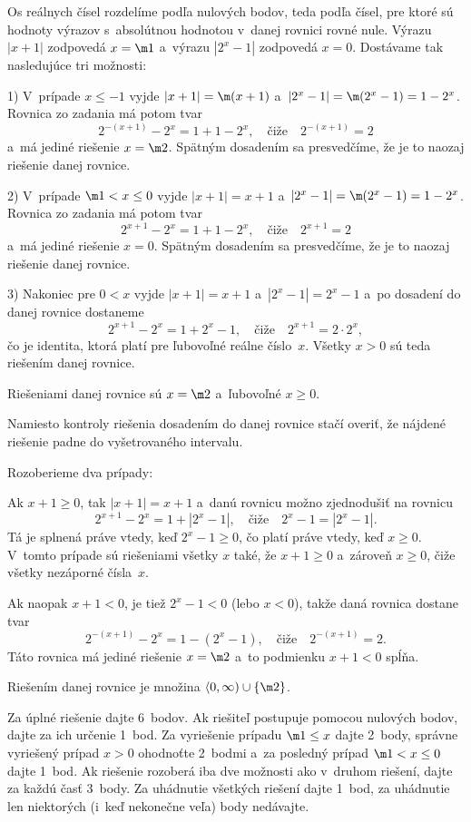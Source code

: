 {%
Os reálnych čísel rozdelíme podľa nulových bodov, teda podľa čísel,
pre ktoré sú hodnoty výrazov s~absolútnou
hodnotou v~danej rovnici rovné nule. Výrazu $|x+1|$ zodpovedá $x=\m1$ a~výrazu
$|2^{x}-1|$ zodpovedá $x = 0$. Dostávame tak nasledujúce tri možnosti:

1) V~prípade $ x \le -1 $ vyjde $|x +1|= \m(x +1)$
a~$|2^{x} -1|= \m(2^{x} -1) = 1-2^x$. Rovnica zo zadania má potom tvar
$$
2^{- (x +1)} -2^{x} = 1 +1-2^x, \quad\text{čiže}\quad 2^{-(x +1)}= 2
$$
a~má jediné riešenie $x=\m2$.
Spätným dosadením sa presvedčíme, že je to naozaj riešenie danej
rovnice.

2) V~prípade $\m1 < x \le 0 $ vyjde $|x +1|= x +1$
a~$|2^{x} -1|= \m(2^{x}-1) = 1-2^x$. Rovnica zo zadania má potom tvar
$$
2^{x +1} -2^{x} =1 +1-2^x, \quad\text{čiže}\quad 2^{x +1}= 2
$$
a~má jediné riešenie $x=0$.
Spätným dosadením sa presvedčíme, že je to naozaj riešenie danej
rovnice.

3) Nakoniec pre $0 < x$ vyjde $|x +1|= x +1$
a~$|2^{x} -1|= 2^{x} -1$ a~po dosadení do danej rovnice dostaneme
$$
2^{x +1} -2^{x}= 1 +2^x - 1, \quad\text{čiže}\quad 2^{x +1} = 2\cdot2^x,
$$
čo je identita, ktorá platí pre ľubovoľné reálne číslo~$x$. Všetky
$x>0$ sú teda riešením danej rovnice.

\odpoved
Riešeniami danej rovnice sú $x = \m2$ a~ľubovoľné $x\ge0$.

\poznamka
Namiesto kontroly riešenia dosadením do danej rovnice stačí overiť, že nájdené riešenie
padne do vyšetrovaného intervalu.

\ineriesenie
Rozoberieme dva prípady:

Ak $x +1 \ge 0$, tak $|x +1|= x+1$ a~danú rovnicu možno zjednodušiť
na rovnicu
$$
2^{x +1} -2^x = 1 + |2^x - 1|,\quad\text{čiže}\quad 2^x - 1 = |2^x - 1|.
$$
Tá je splnená práve vtedy, keď
$2^x - 1 \ge 0$, čo platí práve vtedy, keď $x \ge 0$. V~tomto prípade sú riešeniami
všetky $x$ také, že $x +1\ge 0$ a~zároveň $x\ge 0$, čiže všetky
nezáporné čísla~$x$.

Ak naopak $x +1 < 0$, je tiež $2^x - 1 < 0$ (lebo $x<0$), takže daná rovnica dostane tvar
$$
2^{-(x +1)} -2^{x} = 1 - (2^x - 1),\quad\text{čiže}\quad 2^{-(x +1)} = 2.
$$
Táto rovnica má jediné riešenie $x = \m2$ a~to podmienku $x+1<0$ spĺňa.

Riešením danej rovnice je množina $\langle 0,\infty)\cup\{\m2\}$.

\nobreak\medskip\petit\noindent
Za úplné riešenie dajte 6~bodov.
Ak riešiteľ postupuje pomocou nulových bodov,
dajte za ich určenie 1~bod. Za vyriešenie prípadu $ \m1 \le
x $ dajte 2~body, správne vyriešený prípad $ x > 0 $ ohodnoťte 2~bodmi
a~za posledný prípad $ \m1 < x \le 0 $ dajte 1~bod. Ak riešenie rozoberá iba dve
možnosti ako v~druhom riešení, dajte za každú časť 3~body. Za
uhádnutie všetkých riešení dajte 1~bod, za uhádnutie len niektorých (i~keď nekonečne veľa)
body nedávajte.

\endpetit
\bigbreak
}

